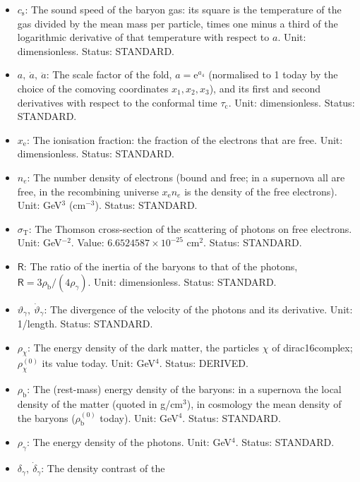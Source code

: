 \documentclass[
  10pt,
]{article}
\begin{document}
\begin{itemize}
  contrast of the baryons and its derivative. Unit: dimensionless.
  Status: STANDARD.
\item
  \(c_{\mathrm{s}}\): The sound speed of the baryon gas: its square is
  the temperature of the gas divided by the mean mass per particle,
  times one minus a third of the logarithmic derivative of that
  temperature with respect to \(a\). Unit: dimensionless. Status:
  STANDARD.
\item
  \(a,\ \dot a,\ \ddot a\): The scale factor of the fold,
  \(a = \mathrm{e}^{a_4}\) (normalised to 1 today by the choice of the
  comoving coordinates \(x_1, x_2, x_3\)), and its first and second
  derivatives with respect to the conformal time \(\tau_{\mathrm{c}}\).
  Unit: dimensionless. Status: STANDARD.
\item
  \(x_{\mathrm{e}}\): The ionisation fraction: the fraction of the
  electrons that are free. Unit: dimensionless. Status: STANDARD.
\item
  \(n_e\): The number density of electrons (bound and free; in a
  supernova all are free, in the recombining universe
  \(x_{\mathrm{e}}n_e\) is the density of the free electrons). Unit:
  GeV\(^3\) (cm\(^{-3}\)). Status: STANDARD.
\item
  \(\sigma_{\mathrm{T}}\): The Thomson cross-section of the scattering
  of photons on free electrons. Unit: GeV\(^{-2}\). Value:
  \(6.6524587\times10^{-25}\) cm\(^2\). Status: STANDARD.
\item
  \(\mathsf{R}\): The ratio of the inertia of the baryons to that of the
  photons, \(\mathsf{R} = 3\rho_{\mathrm{b}}/(4\rho_\gamma)\). Unit:
  dimensionless. Status: STANDARD.
\item
  \(\vartheta_\gamma,\ \dot\vartheta_\gamma\): The divergence of the
  velocity of the photons and its derivative. Unit: 1/length. Status:
  STANDARD.
\item
  \(\rho_\chi\): The energy density of the dark matter, the particles
  \(\chi\) of dirac16complex; \(\rho_\chi^{(0)}\) its value today. Unit:
  GeV\(^4\). Status: DERIVED.
\item
  \(\rho_{\mathrm{b}}\): The (rest-mass) energy density of the baryons:
  in a supernova the local density of the matter (quoted in g/cm\(^3\)),
  in cosmology the mean density of the baryons
  (\(\rho_{\mathrm{b}}^{(0)}\) today). Unit: GeV\(^4\). Status:
  STANDARD.
\item
  \(\rho_\gamma\): The energy density of the photons. Unit: GeV\(^4\).
  Status: STANDARD.
\item
  \(\delta_\gamma,\ \dot\delta_\gamma\): The density contrast of the

\end{itemize}
\end{document}
